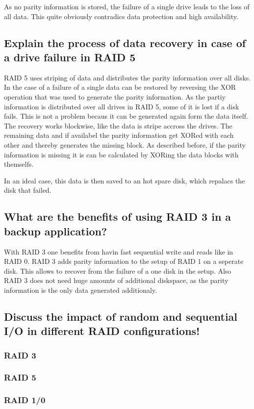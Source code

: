 \documentclass{article}
\begin{document}
	As no parity information is stored,
	the failure of a single drive leads to the loss of all data.
	This quite obviously contradics data protection and high availability.

\subsection{Explain the process of data recovery in case of a drive failure in RAID 5}
	RAID 5 uses striping of data and distributes the parity information over all disks.
	In the case of a failure of a single  data can be restored by reversing the XOR operation
	that was used to generate the parity information.
	As the partiy information is distributed over all drives in RAID 5,
	some of it is lost if a disk fails.
	This is not a problem becaus it can be generated again form the data itself.
	The recovery works blockwise,
	like the data is stripe accross the drives.
	The remaining data and if availabel the parity information get XORed with each other
	and thereby generates the missing block.
	As described before,
	if the parity information is missing it is can be calculated by XORing the data blocks 
	with themselfs.

	In an ideal case,
	this data is then saved to an hot spare disk,
	which repalacs the disk that failed.

\subsection{What are the benefits of using RAID 3 in a backup application?}
	With RAID 3 one benefits from havin fast sequential write and reads like in RAID 0.
	RAID 3 adds parity information to the setup of RAID 1 on a seperate disk.
	This allows to recover from the failure of a one disk in the setup.
	Also RAID 3 does not need huge amounts of additional diskspace,
	as the parity information is the only data generated additionaly.

\subsection{Discuss the impact of random and sequential I/O in different RAID configurations!}
\subsubsection*{RAID 3}

\subsubsection*{RAID 5}

\subsubsection*{RAID 1/0}
\end{document}
